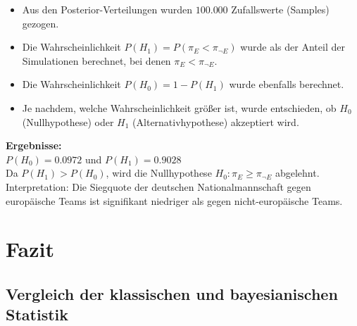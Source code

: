 \documentclass[a4paper,12pt]{article}
\begin{document}
\begin{itemize}
    \item Aus den Posterior-Verteilungen wurden \( 100{.}000 \) Zufallswerte (Samples) gezogen.
    \item Die Wahrscheinlichkeit \( P(H_1) = P(\pi_E < \pi_{\neg E}) \) wurde als der Anteil der Simulationen berechnet, bei denen \( \pi_E < \pi_{\neg E} \).
    \item Die Wahrscheinlichkeit \( P(H_0) = 1 - P(H_1) \) wurde ebenfalls berechnet.
    \item Je nachdem, welche Wahrscheinlichkeit größer ist, wurde entschieden, ob \( H_0 \) (Nullhypothese) oder \( H_1 \) (Alternativhypothese) akzeptiert wird.
\end{itemize}
\textbf{Ergebnisse:} \\
\( P(H_0) = 0.0972 \) und \( P(H_1) = 0.9028 \) \\
Da \( P(H_1) > P(H_0) \), wird die Nullhypothese \( H_0 : \pi_E \geq \pi_{\neg E} \) abgelehnt. \\
Interpretation: Die Siegquote der deutschen Nationalmannschaft gegen europäische Teams ist signifikant niedriger als gegen nicht-europäische Teams.
\newpage


\section{Fazit}


\subsection{Vergleich der klassischen und bayesianischen Statistik}
\end{document}
